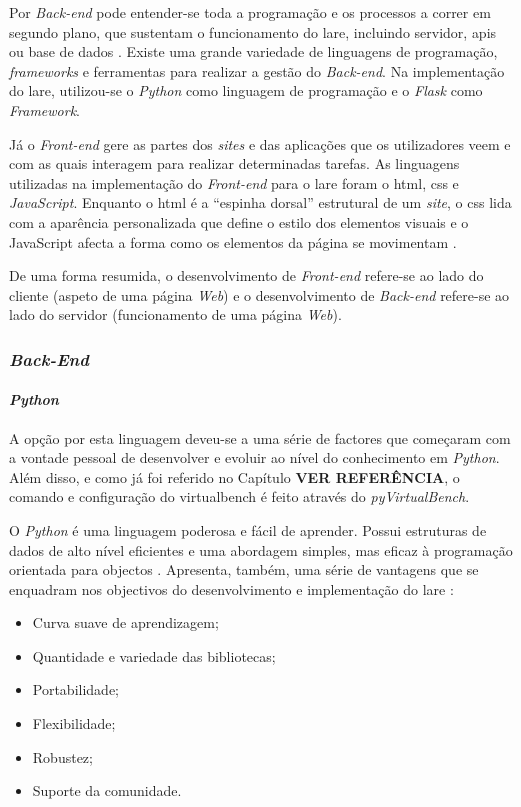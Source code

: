 Por \textit{Back-end} pode entender-se toda a programação e os processos a correr em segundo plano, que sustentam o funcionamento do \acrshort{lare}, incluindo servidor, \acrshort{api}s ou base de dados \cite{FrontbackEnd}. Existe uma grande variedade de linguagens de programação, \textit{frameworks} e ferramentas para realizar a gestão do \textit{Back-end}. Na implementação do \acrshort{lare}, utilizou-se o \textit{Python} como linguagem de programação e o \textit{Flask} como \textit{Framework}.

Já o \textit{Front-end} gere as partes dos \textit{sites} e das aplicações que os utilizadores veem e com as quais interagem para realizar determinadas tarefas. As linguagens utilizadas na implementação do \textit{Front-end} para o \acrshort{lare} foram o \acrshort{html}, \acrfull{css} e \textit{JavaScript}. Enquanto o \acrshort{html} é a ``espinha dorsal'' estrutural de um \textit{site}, o \acrshort{css} lida com a aparência personalizada que define o estilo dos elementos visuais e o JavaScript afecta a forma como os elementos da página se movimentam \cite{FrontbackEnd}.

De uma forma resumida, o desenvolvimento de \textit{Front-end} refere-se ao lado do cliente (aspeto de uma página \textit{Web}) e o desenvolvimento de \textit{Back-end} refere-se ao lado do servidor (funcionamento de uma página \textit{Web}).

\subsubsection{\textit{Back-End}}
\paragraph{\textit{Python}}
A opção por esta linguagem deveu-se a uma série de factores que começaram com a vontade pessoal de desenvolver e evoluir ao nível do conhecimento em \textit{Python}. Além disso, e como já foi referido no Capítulo \textbf{VER REFERÊNCIA}, o comando e configuração do \acrshort{virtualbench} é feito através do \textit{pyVirtualBench}. 

O \textit{Python} é uma linguagem poderosa e fácil de aprender. Possui estruturas de dados de alto nível eficientes e uma abordagem simples, mas eficaz à programação orientada para objectos \cite{ThePython}. Apresenta, também, uma série de vantagens que se enquadram nos objectivos do desenvolvimento e implementação do \acrshort{lare} \cite{pythonvantagens}:
\begin{itemize}
    \item Curva suave de aprendizagem;
    \item Quantidade e variedade das bibliotecas;
    \item Portabilidade;
    \item Flexibilidade;
    \item Robustez;
    \item Suporte da comunidade.
\end{itemize}

